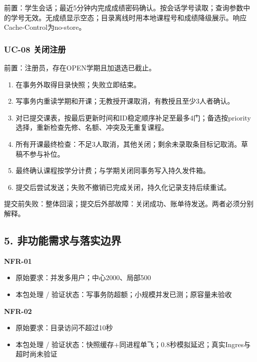 \documentclass[UTF8,11pt,a4paper]{ctexart}
\providecommand{\tightlist}{\setlength{\itemsep}{0pt}\setlength{\parskip}{0pt}}
\begin{document}
前置：学生会话；最近5分钟内完成成绩密码确认。按会话学号读取；查询参数中的学号无效。无成绩显示空态；目录离线时用本地课程号和成绩降级展示。响应Cache-Control为no-store。

\hypertarget{uc-08-ux5173ux95edux6ce8ux518c}{%
\subsubsection{UC-08 关闭注册}\label{uc-08-ux5173ux95edux6ce8ux518c}}

前置：注册员，存在OPEN学期且加退选已截止。

\begin{enumerate}
\def\labelenumi{\arabic{enumi}.}
\tightlist
\item
  在事务外取得目录快照；失败立即结束。
\item
  写事务内重读学期和开课；无教授开课取消，有教授且至少3人者确认。
\item
  对已提交课表，按最后更新时间和ID稳定顺序补足至最多4门；备选按priority选择，重新检查先修、名额、冲突及无重复课程。
\item
  所有开课最终检查：不足3人取消，其他关闭；剩余未录取条目标记取消。草稿不参与补位。
\item
  最终确认课程按学分计费；与学期关闭同事务写入持久发件箱。
\item
  提交后尝试发送；失败不撤销已完成关闭，持久化记录支持后续重试。
\end{enumerate}

提交前失败：整体回滚；提交后外部故障：关闭成功、账单待发送。两者必须分别解释。

\hypertarget{5-ux975eux529fux80fdux9700ux6c42ux4e0eux843dux5b9eux8fb9ux754c}{%
\subsection{5.
非功能需求与落实边界}\label{5-ux975eux529fux80fdux9700ux6c42ux4e0eux843dux5b9eux8fb9ux754c}}

\textbf{NFR-01}

\begin{itemize}
\tightlist
\item
  原始要求：并发多用户；中心2000、局部500
\item
  本包处理 / 验证状态：写事务防超额；小规模并发已测；原容量未验收
\end{itemize}

\textbf{NFR-02}

\begin{itemize}
\tightlist
\item
  原始要求：目录访问不超过10秒
\item
  本包处理 /
  验证状态：快照缓存+同进程单飞；0.8秒模拟延迟；真实Ingres与超时尚未验证
\end{itemize}
\end{document}
